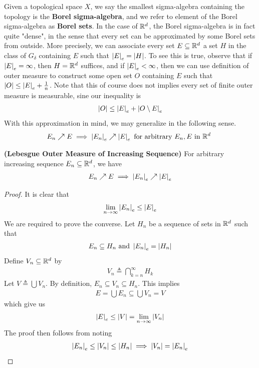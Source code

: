 \documentclass{report}
\begin{document}
\begin{mdframed}
  Given a topological space $X$, we say the smallest sigma-algebra containing the topology is the  \textbf{Borel sigma-algebra}, and we refer to element of the Borel sigma-algebra as \textbf{Borel sets}. In the case of $\mathbb{R}^d$, the Borel sigma-algebra is in fact quite "dense", in the sense that every set can be approximated by some Borel sets from outside. More precisely, we can associate every set $E\subseteq \mathbb{R}^d$ a set $H$ in the class of  $G_\delta$ containing $E$ such that $\left|E\right|_e=\left|H\right|$. To see this is true, observe that if $\left|E\right|_e=\infty$, then $H=\mathbb{R}^d$ suffices, and if  $\left|E\right|_e<\infty$, then we can use definition of outer measure to construct some open set $O$ containing $E$ such that $\left|O\right|\leq \left|E\right|_e + \frac{1}{n} $.  Note that this of course does not implies every set of finite outer measure is measurable, sine our inequality is 
  \begin{align*}
  \left|O\right|\leq \left|E\right|_e + \left|O\setminus E\right|_e
  \end{align*}
  With this approximation in mind, we may generalize  in the following sense.  
\begin{align*}
E_n \nearrow E \implies \left|E_n\right|_e\nearrow \left|E\right|_e\text{ for arbitrary $E_n,E$ in $\mathbb{R}^d$ }
\end{align*}
\end{mdframed}
\begin{theorem}
\textbf{(Lebesgue Outer Measure of Increasing Sequence)} For arbitrary increasing sequence $E_n\subseteq \mathbb{R}^d$, we have 
\begin{align*}
E_n \nearrow E \implies  \left|E_n\right|_e \nearrow \left|E\right|_e
\end{align*}
\end{theorem}
\begin{proof}
It is clear that 
\begin{align*}
\lim_{n\to \infty} \left|E_n\right|_e \leq \left|E\right|_e 
\end{align*}
We are required to prove the converse. Let $H_n$ be a sequence of sets in  $\mathbb{R}^d$ such that 
 \begin{align*}
E_n\subseteq H_n \text{ and }\left|E_n\right|_e=\left|H_n\right|
\end{align*}
Define $V_n\subseteq \mathbb{R}^d$ by 
\begin{align*}
V_n \triangleq \bigcap_{k=n}^{\infty}H_k 
\end{align*}
Let $V\triangleq \bigcup V_n$. By definition,  $E_n \subseteq V_n \subseteq H_n$. This implies  
\begin{align*}
  E= \bigcup E_n \subseteq \bigcup V_n = V
\end{align*}
which give us 
\begin{align*}
\left|E\right|_e \leq \left|V\right| = \lim_{n\to \infty} \left|V_n\right|
\end{align*}
The proof then follows from noting 
\begin{align*}
\left|E_n\right|_e\leq \left|V_n\right| \leq \left|H_n\right| \implies  \left|V_n\right|= \left|E_n\right|_e
\end{align*}
\end{proof}
\end{document}
